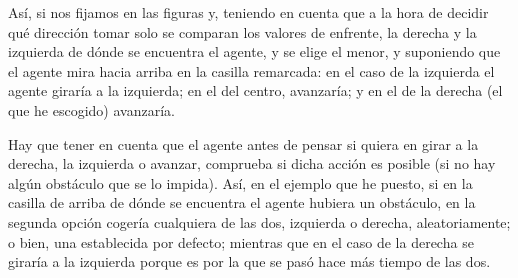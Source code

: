 \documentclass[a4paper, 11pt]{article}
\begin{document}

Así, si nos fijamos en las figuras y, teniendo en cuenta que a la hora de decidir qué dirección tomar solo se comparan los valores de enfrente, la derecha y la izquierda de dónde se encuentra el agente, y se elige el menor, y suponiendo que el agente mira hacia arriba en la casilla remarcada: en el caso de la izquierda el agente giraría a la izquierda; en el del centro, avanzaría; y en el de la derecha (el que he escogido) avanzaría.

Hay que tener en cuenta que el agente antes de pensar si quiera en girar a la derecha, la izquierda o avanzar, comprueba si dicha acción es posible (si no hay algún obstáculo que se lo impida). Así, en el ejemplo que he puesto, si en la casilla de arriba de dónde se encuentra el agente hubiera un obstáculo, en la segunda opción cogería cualquiera de las dos, izquierda o derecha, aleatoriamente; o bien, una establecida por defecto; mientras que en el caso de la derecha 	se giraría a la izquierda porque es por la que se pasó hace más tiempo de las dos. 
\end{document}
